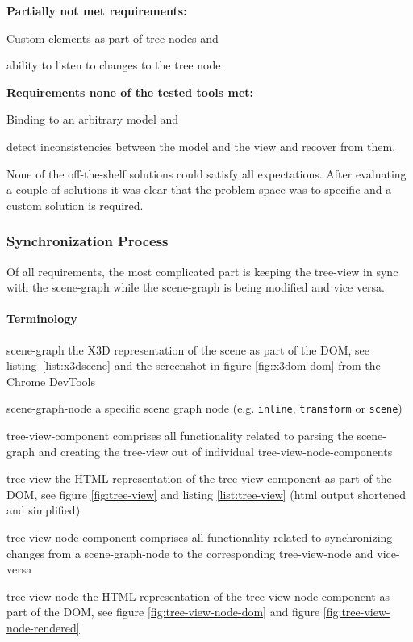 \textbf{Partially not met requirements:}

\begin{itemize*}
  \item Custom elements as part of tree nodes and
  \item ability to listen to changes to the tree node
\end{itemize*}

\textbf{Requirements none of the tested tools met:}

\begin{itemize*}
  \item Binding to an arbitrary model and
  \item detect inconsistencies between the model and the view and recover from them.
\end{itemize*}

None of the off-the-shelf solutions could satisfy all expectations. After
evaluating a couple of solutions it was clear that the problem space was to
specific and a custom solution is required.

\subsubsection{Synchronization Process}
\label{synchronization-process}

Of all requirements, the most complicated part is keeping the tree-view in sync
with the scene-graph while the scene-graph is being modified and vice
versa.

\paragraph{Terminology}
\label{terminology}

\begin{description*}
  \item[scene-graph]
    the X3D representation of the scene as part of the DOM, see listing~\ref{list:x3dscene} and the screenshot in figure \ref{fig:x3dom-dom} from the Chrome DevTools
  \item[scene-graph-node]
    a specific scene graph node (e.g. \texttt{inline}, \texttt{transform} or \texttt{scene})
  \item[tree-view-component]
    comprises all functionality related to parsing the scene-graph and creating the tree-view out of individual tree-view-node-components
  \item[tree-view]
    the HTML representation of the tree-view-component as part of the DOM, see figure \ref{fig:tree-view} and listing \ref{list:tree-view} (html output
    shortened and simplified)
  \item[tree-view-node-component]
    comprises all functionality related to synchronizing changes from a scene-graph-node to the corresponding
    tree-view-node and vice-versa
  \item[tree-view-node]
    the HTML representation of the tree-view-node-component as part of the DOM, see figure \ref{fig:tree-view-node-dom} and figure \ref{fig:tree-view-node-rendered}
\end{description*}

